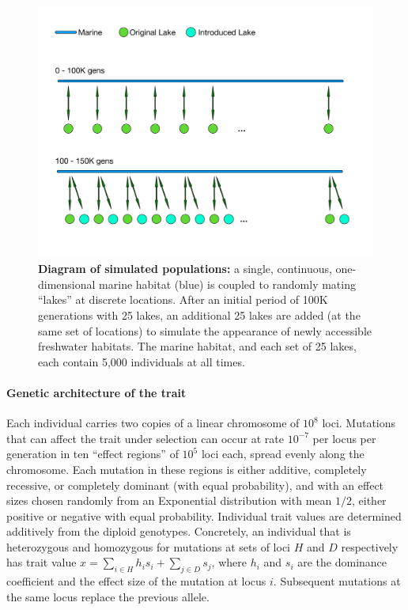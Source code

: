 \documentclass{article}
\begin{document}
\begin{figure}
	\begin{center}
  		\includegraphics[width=0.6\linewidth]{GeographyFigure.pdf}
  		\caption{
            \textbf{Diagram of simulated populations:}
            a single, continuous, one-dimensional marine habitat (blue)
            is coupled to randomly mating ``lakes'' at discrete locations.
            After an initial period of 100K generations with 25 lakes,
            an additional 25 lakes are added (at the same set of locations)
            to simulate the appearance of newly accessible freshwater habitats.
            The marine habitat, and each set of 25 lakes, each contain 5,000 individuals at all times.
			}
  		\label{fig:Geo}
	\end{center}
\end{figure}


\paragraph{Genetic architecture of the trait}
Each individual carries two copies of a linear chromosome of $10^8$ loci.
Mutations that can affect the trait under selection can occur at rate $10^{-7}$ per locus per generation
in ten ``effect regions'' of $10^5$ loci each,
spread evenly along the chromosome.
Each mutation in these regions is either additive, completely recessive, or completely dominant (with equal probability), 
and with an effect sizes chosen randomly from an Exponential distribution with mean $1/2$, either positive or negative with equal probability. 
Individual trait values are determined additively from the diploid genotypes. 
Concretely, an individual that is heterozygous and homozygous for mutations at sets of loci $H$ and $D$ respectively has trait value 
$x = \sum_{i \in H} h_i s_i + \sum_{j \in D} s_j$, 
where $h_i$ and $s_i$ are the dominance coefficient and the effect size of the mutation at locus $i$.
Subsequent mutations at the same locus replace the previous allele.
\end{document}
